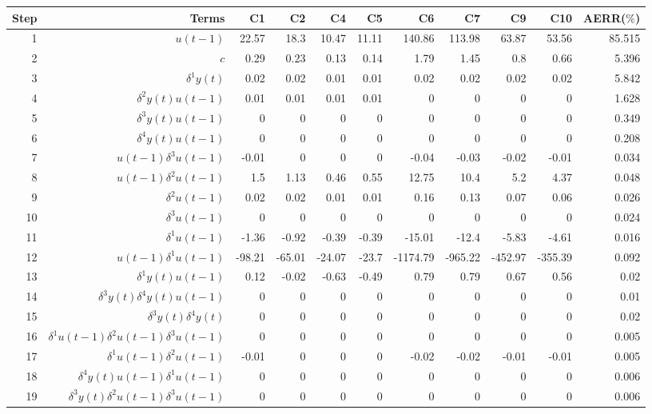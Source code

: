 \begin{tabular}{rrrrrrrrrrr}
Step & Terms & C1 & C2 & C4 & C5 & C6 & C7 & C9 & C10 & AERR($\%$) \\ 
\hline 
1 & $u(t-1)$ & 22.57 & 18.3 & 10.47 & 11.11 & 140.86 & 113.98 & 63.87 & 53.56 & 85.515 \\ 
2 & $c$ & 0.29 & 0.23 & 0.13 & 0.14 & 1.79 & 1.45 & 0.8 & 0.66 & 5.396 \\ 
3 & $\delta^1 y(t)$ & 0.02 & 0.02 & 0.01 & 0.01 & 0.02 & 0.02 & 0.02 & 0.02 & 5.842 \\ 
4 & $\delta^2 y(t)u(t-1)$ & 0.01 & 0.01 & 0.01 & 0.01 & 0 & 0 & 0 & 0 & 1.628 \\ 
5 & $\delta^3 y(t)u(t-1)$ & 0 & 0 & 0 & 0 & 0 & 0 & 0 & 0 & 0.349 \\ 
6 & $\delta^4 y(t)u(t-1)$ & 0 & 0 & 0 & 0 & 0 & 0 & 0 & 0 & 0.208 \\ 
7 & $u(t-1)\delta^3 u(t-1)$ & -0.01 & 0 & 0 & 0 & -0.04 & -0.03 & -0.02 & -0.01 & 0.034 \\ 
8 & $u(t-1)\delta^2 u(t-1)$ & 1.5 & 1.13 & 0.46 & 0.55 & 12.75 & 10.4 & 5.2 & 4.37 & 0.048 \\ 
9 & $\delta^2 u(t-1)$ & 0.02 & 0.02 & 0.01 & 0.01 & 0.16 & 0.13 & 0.07 & 0.06 & 0.026 \\ 
10 & $\delta^3 u(t-1)$ & 0 & 0 & 0 & 0 & 0 & 0 & 0 & 0 & 0.024 \\ 
11 & $\delta^1 u(t-1)$ & -1.36 & -0.92 & -0.39 & -0.39 & -15.01 & -12.4 & -5.83 & -4.61 & 0.016 \\ 
12 & $u(t-1)\delta^1 u(t-1)$ & -98.21 & -65.01 & -24.07 & -23.7 & -1174.79 & -965.22 & -452.97 & -355.39 & 0.092 \\ 
13 & $\delta^1 y(t)u(t-1)$ & 0.12 & -0.02 & -0.63 & -0.49 & 0.79 & 0.79 & 0.67 & 0.56 & 0.02 \\ 
14 & $\delta^3 y(t)\delta^4 y(t)u(t-1)$ & 0 & 0 & 0 & 0 & 0 & 0 & 0 & 0 & 0.01 \\ 
15 & $\delta^3 y(t)\delta^4 y(t)$ & 0 & 0 & 0 & 0 & 0 & 0 & 0 & 0 & 0.02 \\ 
16 & $\delta^1 u(t-1)\delta^2 u(t-1)\delta^3 u(t-1)$ & 0 & 0 & 0 & 0 & 0 & 0 & 0 & 0 & 0.005 \\ 
17 & $\delta^1 u(t-1)\delta^2 u(t-1)$ & -0.01 & 0 & 0 & 0 & -0.02 & -0.02 & -0.01 & -0.01 & 0.005 \\ 
18 & $\delta^4 y(t)u(t-1)\delta^1 u(t-1)$ & 0 & 0 & 0 & 0 & 0 & 0 & 0 & 0 & 0.006 \\ 
19 & $\delta^3 y(t)\delta^2 u(t-1)\delta^3 u(t-1)$ & 0 & 0 & 0 & 0 & 0 & 0 & 0 & 0 & 0.006 \\ 

\end{tabular}
